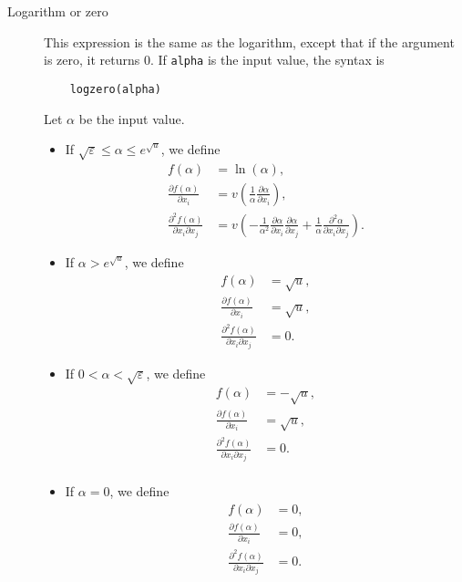 \documentclass[12pt,a4paper]{article}
\begin{document}
\begin{description}
\item[Logarithm or zero] This expression is the same as the logarithm, except that if the argument is zero, it returns 0. If \lstinline+alpha+ is the input value, the syntax is
  \begin{lstlisting}
    logzero(alpha)
  \end{lstlisting}
  Let $\alpha$ be the input value.
  \begin{itemize}
  \item If $\sqrt{\varepsilon} \leq \alpha \leq e^{\sqrt{u}}$, we define
    \begin{align*}
    f(\alpha)& =\ln(\alpha), \\ 
    \frac{\partial f(\alpha)}{\partial x_i} &= v\left(\frac{1}{\alpha} \frac{\partial \alpha}{\partial x_i}\right), \\
    \frac{\partial^2 f(\alpha)}{\partial x_i \partial x_j} &=
    v\left(-\frac{1}{\alpha^{2}}
    \frac{\partial \alpha}{\partial x_i}
    \frac{\partial \alpha}{\partial x_j }
    + \frac{1}{\alpha}
    \frac{\partial^2 \alpha}{\partial x_i \partial x_j}
      \right).
    \end{align*}
  \item If $\alpha > e^{\sqrt{u}}$, we define 
    \begin{align*}
      f(\alpha) &= \sqrt{u}, \\
      \frac{\partial f(\alpha)}{\partial x_i} &= \sqrt{u},\\
      \frac{\partial^2 f(\alpha)}{\partial x_i \partial x_j} &= 0.
    \end{align*}
  \item If $0 <  \alpha < \sqrt{\varepsilon}$, we define
    \begin{align*}
      f(\alpha) &= -\sqrt{u}, \\
      \frac{\partial f(\alpha)}{\partial x_i} &= \sqrt{u},\\
      \frac{\partial^2 f(\alpha)}{\partial x_i\partial x_j} &= 0.\\
    \end{align*}
  \item If $\alpha = 0$, we define
    \begin{align*}
      f(\alpha) &= 0, \\
      \frac{\partial f(\alpha)}{\partial x_i} &= 0,\\
      \frac{\partial^2 f(\alpha)}{\partial x_i\partial x_j} &= 0.\\
    \end{align*}
  \end{itemize}


\end{description}
\end{document}
